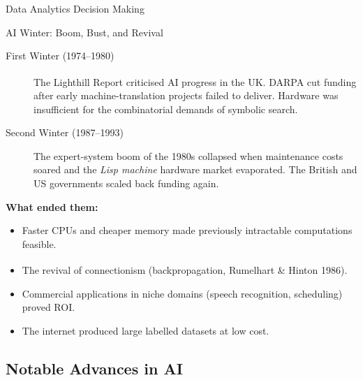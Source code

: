 \begin{v3topic}{Data Analytics Decision Making}
\begin{v3topic}{AI Winter: Boom, Bust, and Revival}
        \begin{description}
            \item[First Winter (1974--1980)] The Lighthill Report\textsuperscript{\cite{lighthillArtificialIntelligenceSurvey1973}} criticised AI progress in the UK. DARPA cut funding after early machine-translation projects failed to deliver. Hardware was insufficient for the combinatorial demands of symbolic search.
            \item[Second Winter (1987--1993)] The expert-system boom of the 1980s collapsed when maintenance costs soared and the \emph{Lisp machine} hardware market evaporated. The British and US governments scaled back funding again.
        \end{description}

        \textbf{What ended them:}
        \begin{itemize}
            \item Faster CPUs and cheaper memory made previously intractable computations feasible.
            \item The revival of connectionism (backpropagation, Rumelhart \& Hinton 1986)\textsuperscript{\cite{rumelhartLearningRepresentationsBackpropagating1986}}.
            \item Commercial applications in niche domains (speech recognition, scheduling) proved ROI.
            \item The internet produced large labelled datasets at low cost.
        \end{itemize}
\end{v3topic}

    \subsection{Notable Advances in AI}


\end{v3topic}
